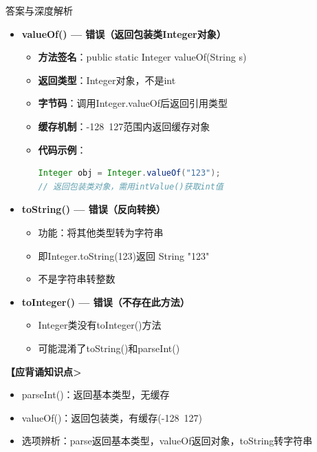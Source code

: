 \documentclass[12pt, a4paper]{ctexart}
\begin{document}
\begin{enumerate}[label=\textbf{\arabic*.}]
\begin{bluebox}{答案与深度解析}
\begin{itemize}[leftmargin=*, nosep, label={}]
			      \item[B] \textbf{valueOf() — 错误（返回包装类Integer对象）}
			            \begin{itemize}[label={}, leftmargin=*, nosep]
				            \item \textbf{方法签名}：public static Integer valueOf(String s)
				            \item \textbf{返回类型}：Integer对象，不是int
				            \item \textbf{字节码}：调用Integer.valueOf后返回引用类型
				            \item \textbf{缓存机制}：-128~127范围内返回缓存对象
				            \item \textbf{代码示例}：
				                  \begin{lstlisting}[language=Java]
Integer obj = Integer.valueOf("123");
// 返回包装类对象，需用intValue()获取int值
				            \end{lstlisting}
			            \end{itemize}

			      \item[C] \textbf{toString() — 错误（反向转换）}
			            \begin{itemize}[label={}, leftmargin=*, nosep]
				            \item 功能：将其他类型转为字符串
				            \item 即Integer.toString(123)返回 String "123"
				            \item 不是字符串转整数
			            \end{itemize}

			      \item[D] \textbf{toInteger() — 错误（不存在此方法）}
			            \begin{itemize}[label={}, leftmargin=*, nosep]
				            \item Integer类没有toInteger()方法
				            \item 可能混淆了toString()和parseInt()
			            \end{itemize}
		      \end{itemize}

		      \textbf{【应背诵知识点>}
		      \begin{itemize}[label={}, nosep]
			      \item parseInt()：返回基本类型，无缓存
			      \item valueOf()：返回包装类，有缓存(-128~127)
			      \item 选项辨析：parse返回基本类型，valueOf返回对象，toString转字符串
		      \end{itemize}


\end{bluebox}
\end{enumerate}
\end{document}
